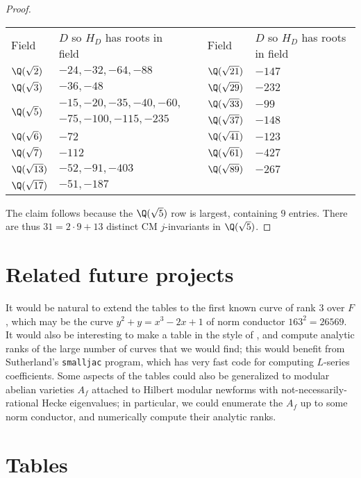 \documentclass{amsart}
\begin{document}
\begin{proof}
\begin{center}
\begin{tabular}{@{}llcll@{}}\toprule
Field & $D$ so $H_D$ has roots in field & \phantom{ab} & Field & $D$ so $H_D$ has roots in field \\\cmidrule{1-2}\cmidrule{4-5}
$\Q(\sqrt{2})$ & $-24,-32,-64,-88$ & & $\Q(\sqrt{21})$ & $-147$ \\
$\Q(\sqrt{3})$ & $-36,-48$ & & $\Q(\sqrt{29})$ & $-232$ \\
\multirow{2}{*}{$\Q(\sqrt{5})$} & $-15,-20,-35,-40,-60,$ & & $\Q(\sqrt{33})$ & $-99$ \\
      & $-75,-100,-115,-235$ & & $\Q(\sqrt{37})$ & $-148$ \\
$\Q(\sqrt{6})$ & $-72$ & & $\Q(\sqrt{41})$ & $-123$ \\
$\Q(\sqrt{7})$ & $-112$ & & $\Q(\sqrt{61})$ & $-427$ \\
$\Q(\sqrt{13})$ & $-52,-91,-403$ & & $\Q(\sqrt{89})$ & $-267$ \\
$\Q(\sqrt{17})$ & $-51,-187$ & & & \\\bottomrule
\end{tabular}
\end{center}
The claim follows because the $\Q(\sqrt{5})$ row is largest,
containing $9$ entries.  There are thus $31 = 2\cdot 9 + 13$ distinct CM $j$-invariants
in $\Q(\sqrt{5})$.

\end{proof}

\section{Related future projects}\label{sec:future}

It would be natural to extend the tables to the first known curve of
rank $3$ over $F$, which may be the curve $y^2 + y = x^3 -2x + 1$ of
norm conductor $163^2=26569$.  It would also be interesting to make a
table in the style of \cite{stein-watkins:ants5}, and compute analytic
ranks of the large number of curves that we would find; this would
benefit from Sutherland's {\tt smalljac} program, which has very fast code
for computing $L$-series coefficients.  Some aspects of the tables
could also be generalized to modular abelian varieties $A_f$ attached
to Hilbert modular newforms with not-necessarily-rational Hecke
eigenvalues; in particular, we could enumerate the $A_f$ up to some
norm conductor, and numerically compute their analytic ranks.

\section{Tables}\label{sec:tables}
\end{document}
